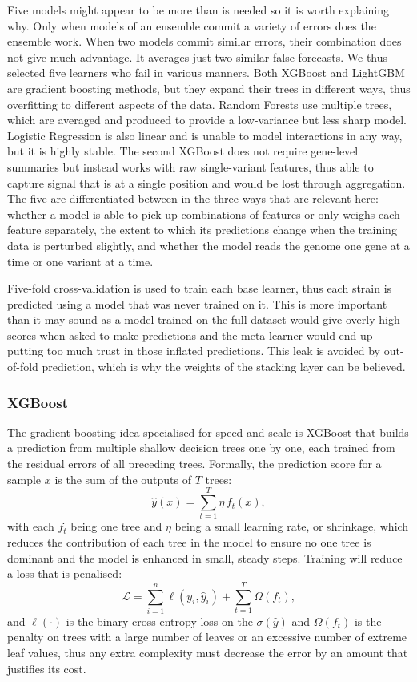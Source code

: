\documentclass[journal]{IEEEtran}
\begin{document}
Five models might appear to be more than is needed so it is worth explaining why.
Only when models of an ensemble commit a variety of errors does the ensemble work.
When two models commit similar errors, their combination does not give much
advantage. It averages just two similar false forecasts. We thus selected five
learners who fail in various manners. Both XGBoost and LightGBM are gradient
boosting methods, but they expand their trees in different ways, thus overfitting to
different aspects of the data. Random Forests use multiple trees, which are averaged
and produced to provide a low-variance but less sharp model. Logistic Regression is
also linear and is unable to model interactions in any way, but it is highly stable.
The second XGBoost does not require gene-level summaries but instead works with raw
single-variant features, thus able to capture signal that is at a single position
and would be lost through aggregation. The five are differentiated between in the
three ways that are relevant here: whether a model is able to pick up combinations
of features or only weighs each feature separately, the extent to which its
predictions change when the training data is perturbed slightly, and whether the
model reads the genome one gene at a time or one variant at a time.

Five-fold cross-validation is used to train each base learner, thus each strain is
predicted using a model that was never trained on it. This is more important than it
may sound as a model trained on the full dataset would give overly high scores when
asked to make predictions and the meta-learner would end up putting too much trust
in those inflated predictions. This leak is avoided by out-of-fold prediction, which
is why the weights of the stacking layer can be believed.

\subsubsection{XGBoost}
The gradient boosting idea \cite{friedman2001gbm} specialised for speed and scale is
XGBoost \cite{chen2016xgboost} that builds a prediction from multiple shallow
decision trees one by one, each trained from the residual errors of all preceding
trees. Formally, the prediction score for a sample $x$ is the sum of the outputs of
$T$ trees:
\begin{equation}
\hat{y}(x) = \sum_{t=1}^{T} \eta\, f_t(x),
\label{eq:xgb_score}
\end{equation}
with each $f_t$ being one tree and $\eta$ being a small learning rate, or shrinkage,
which reduces the contribution of each tree in the model to ensure no one tree is
dominant and the model is enhanced in small, steady steps. Training will reduce a
loss that is penalised:
\begin{equation}
\mathcal{L} = \sum_{i=1}^{n} \ell(y_i, \hat{y}_i) + \sum_{t=1}^{T} \Omega(f_t),
\label{eq:xgb_loss}
\end{equation}
and $\ell(\cdot)$ is the binary cross-entropy loss on the $\sigma(\hat{y})$ and
$\Omega(f_t)$ is the penalty on trees with a large number of leaves or an excessive
number of extreme leaf values, thus any extra complexity must decrease the error by
an amount that justifies its cost.
\end{document}
